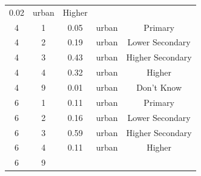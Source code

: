 \documentclass[stu, 12pt, floatsintext,longtable]{apa7}
\begin{document}
\begin{longtable}{ccccc}
    0.02
                                                       &
    urban                                              & Higher
    \\
    4                                                  & 1                    &
    0.05
                                                       &
    urban                                              & Primary
    \\
    4                                                  & 2                    &
    0.19
                                                       &
    urban                                              & Lower Secondary
    \\
    4                                                  & 3                    &
    0.43
                                                       &
    urban                                              & Higher Secondary
    \\
    4                                                  & 4                    &
    0.32
                                                       &
    urban                                              & Higher
    \\
    4                                                  & 9                    &
    0.01
                                                       &
    urban                                              & Don't Know
    \\
    6                                                  & 1                    &
    0.11
                                                       &
    urban                                              & Primary
    \\
    6                                                  & 2                    &
    0.16
                                                       &
    urban                                              & Lower Secondary
    \\
    6                                                  & 3                    &
    0.59
                                                       &
    urban                                              & Higher Secondary
    \\
    6                                                  & 4                    &
    0.11
                                                       &
    urban                                              & Higher
    \\
    6                                                  & 9                    &

\end{longtable}
\end{document}
